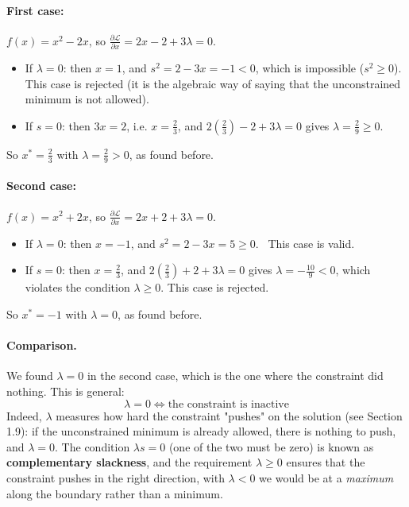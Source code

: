 \documentclass[]{article}
\begin{document}
	\paragraph{First case:} $f(x) = x^2 - 2x$, so $\frac{\partial \mathcal{L}}{\partial x} = 2x - 2 + 3\lambda = 0$.
	\begin{itemize}
		\item If $\lambda = 0$: then $x = 1$, and $s^2 = 2 - 3x = -1 < 0$, which is impossible ($s^2 \geq 0$).
		This case is rejected (it is the algebraic way of saying that the unconstrained minimum is not allowed).
		\item If $s = 0$: then $3x = 2$, i.e. $x = \frac{2}{3}$, and $2\left(\frac{2}{3}\right) - 2 + 3\lambda = 0$ gives $\lambda = \frac{2}{9} \geq 0$. \checkmark
	\end{itemize}
	So $x^* = \frac{2}{3}$ with $\lambda = \frac{2}{9} > 0$, as found before. \checkmark

	\paragraph{Second case:} $f(x) = x^2 + 2x$, so $\frac{\partial \mathcal{L}}{\partial x} = 2x + 2 + 3\lambda = 0$.
	\begin{itemize}
		\item If $\lambda = 0$: then $x = -1$, and $s^2 = 2 - 3x = 5 \geq 0$. \checkmark \ This case is valid.
		\item If $s = 0$: then $x = \frac{2}{3}$, and $2\left(\frac{2}{3}\right) + 2 + 3\lambda = 0$ gives $\lambda = -\frac{10}{9} < 0$, which violates the condition $\lambda \geq 0$.
		This case is rejected.
	\end{itemize}
	So $x^* = -1$ with $\lambda = 0$, as found before. \checkmark

	\paragraph{Comparison.}
	We found $\lambda = 0$ in the second case, which is the one where the constraint did nothing.
	This is general:
	$$
	\lambda = 0 \iff \text{the constraint is inactive}
	$$
	Indeed, $\lambda$ measures how hard the constraint "pushes" on the solution (see Section 1.9): if the unconstrained minimum is already allowed, there is nothing to push, and $\lambda = 0$.
	The condition $\lambda s = 0$ (one of the two must be zero) is known as \textbf{complementary slackness}, and the requirement $\lambda \geq 0$ ensures that the constraint pushes in the right direction, with $\lambda < 0$ we would be at a \textit{maximum} along the boundary rather than a minimum.
\end{document}

